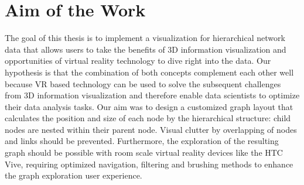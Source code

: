 \section{Aim of the Work}

The goal of this thesis is to implement a visualization for hierarchical network data that allows users to take the benefits of 3D information visualization and opportunities of virtual reality technology to dive right into the data. Our hypothesis is that the combination of both concepts complement each other well because VR based technology can be used to solve the subsequent challenges from 3D information visualization and therefore enable data scientists to optimize their data analysis tasks. 
Our aim was to design a customized graph layout that calculates the position and size of each node by the hierarchical structure: child nodes are nested within their parent node. 
Visual clutter by overlapping of nodes and links should be prevented. 
Furthermore, the exploration of the resulting graph should be possible with room scale virtual reality devices like the HTC Vive, requiring optimized navigation, filtering and brushing methods to enhance the graph exploration user experience.

